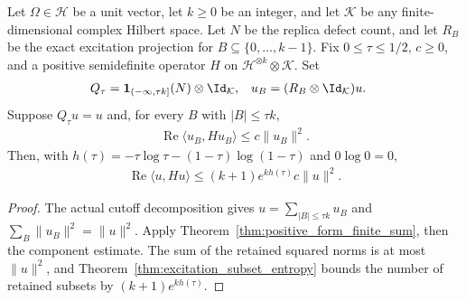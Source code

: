 \begin{theorem}
  \label{thm:replica_cutoff_component_bound}
  Let $\Omega\in\mathcal H$ be a unit vector, let $k\ge0$ be an integer,
  and let $\mathcal K$ be any finite-dimensional complex Hilbert space.
  Let $N$ be the replica defect count, and let $R_B$ be the exact
  excitation projection for $B\subseteq\{0,\ldots,k-1\}$.
  Fix $0\le\tau\le1/2$, $c\ge0$, and a positive semidefinite operator
  $H$ on $\mathcal H^{\otimes k}\otimes\mathcal K$. Set
  \begin{align}
    Q_\tau&=\mathbf1_{(-\infty,\tau k]}(N)\otimes \Id_{\mathcal K},
    &u_B&=(R_B\otimes \Id_{\mathcal K})u.
  \end{align}
  Suppose $Q_\tau u=u$ and, for every $B$ with $|B|\le\tau k$,
  \begin{align}
    \operatorname{Re}\langle u_B,Hu_B\rangle\le c\|u_B\|^2.
  \end{align}
  Then, with $h(\tau)=-\tau\log\tau-(1-\tau)\log(1-\tau)$ and
  $0\log0=0$,
  \begin{align}
    \operatorname{Re}\langle u,Hu\rangle
      \le (k+1)e^{kh(\tau)}c\|u\|^2.
  \end{align}
\end{theorem}
\begin{proof}
  The actual cutoff decomposition gives $u=\sum_{|B|\le\tau k}u_B$
  and $\sum_B\|u_B\|^2=\|u\|^2$. Apply
  Theorem~\ref{thm:positive_form_finite_sum}, then the component estimate.
  The sum of the retained squared norms is at most $\|u\|^2$, and
  Theorem~\ref{thm:excitation_subset_entropy} bounds the number of retained
  subsets by $(k+1)e^{kh(\tau)}$.
\end{proof}

